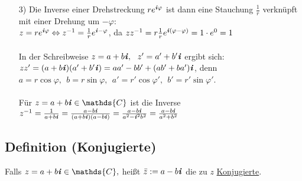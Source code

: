 \documentclass[a4paper, 12pt,titlepage, pdf, headsepline]{article}
\newcommand{\C}{\mathds{C}}
\newcommand{\uline}[1]{\underline{#1}}
\newcommand*\colvec[1]{
	\global\colveccount#1
	\begin{pmatrix}
		\colvecnext
	}
\def\colvecnext#1{
		#1
		\global\advance\colveccount-1
		\ifnum\colveccount>0
		\\
		\expandafter\colvecnext
		\else
	\end{pmatrix}
	\fi
}
\renewcommand{\i}{\textbf{\textit{i}}}
\renewcommand{\>}{\rightarrow}
\renewcommand{\*}{\cdot}
\renewcommand{\phi}{\varphi}
\renewcommand{\vec}[1]{\colvec{#1}}
\begin{document}
\begin{itemize}
\begin{minipage}[c]{0.45\textwidth}
		      				      \end{minipage}
		      				\item[3)] Die Inverse einer Drehstreckung $re^{\i\phi}$ ist dann eine Stauchung $\frac{1}{r}$ verknüpft mit einer Drehung um $-\phi:$\\
		      				      $z = re^{\i\phi} \Leftrightarrow z^{-1} = \frac{1}{r} e^{\i-\phi}$, da $zz^{-1} = r \frac{1}{r} e^{\i(\phi - \phi)} = 1 \cdot e^0 = 1$\\
		      				      \\
		      				      In der Schreibweise $z= a+b\i,~~ z' = a' + b'\i$ ergibt sich:\\ $zz' = (a +b\i)(a' + b'\i) = aa' -bb' + (ab' + ba')\i$, denn \\$a = r \cos \phi,~~ b= r \sin\phi,~~ a' = r' \cos\phi',~~ b' = r' \sin\phi'$.\\ \\
		      				      Für $z = a +b\i \in \C$ ist die Inverse\\ $z^{-1} = \frac{1}{a+b\i} = \frac{a -b\i}{(a+ b\i)(a -b\i)}= \frac{a-b\i}{a^2 - \i^2 b^2} = \frac{a-b\i}{a^2 +b^2}$
		      			\end{itemize}
		      			\subsection{Definition (Konjugierte)}
		      			Falls $z = a+b\i \in \C,$ heißt $\bar{z} := a-b\i$ die zu $z$ \uline{Konjugierte}.
		      				
\end{document}

